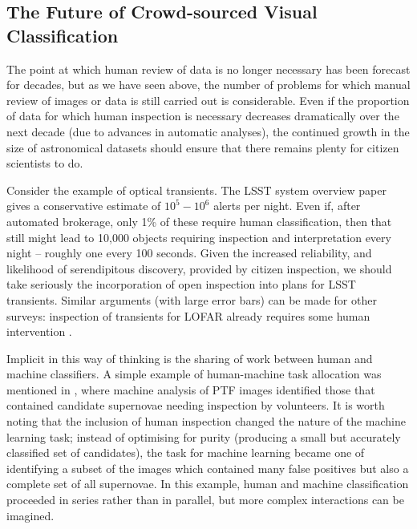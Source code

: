 \documentclass{ar2e}
\begin{document}

% 

\subsection{The Future of Crowd-sourced Visual Classification}

The point at which human review of data is no longer necessary has been forecast
for decades, but as we have seen above, the number of problems for which manual
review of images or data is still carried out is considerable. Even if the
proportion of data for which human inspection is necessary decreases
dramatically over the next decade (due to advances in automatic analyses), the
continued growth in the size of astronomical datasets should ensure that there
remains plenty for citizen scientists to do. 

Consider the example of optical transients. The LSST system overview paper
\citep{LSSTsystem} gives a conservative estimate of $10^5-10^6$ alerts per
night. Even if, after automated brokerage, only 1\% of these require human
classification, then that still might lead to 10,000 objects requiring
inspection and interpretation every night -- roughly one every 100 seconds.
Given the increased reliability, and likelihood of serendipitous discovery,
provided by citizen inspection, we should take seriously the incorporation of
open inspection into plans for LSST transients. Similar arguments (with large
error bars) can be made for other surveys: inspection of transients for LOFAR
already requires some human intervention \citep{LOFAR}. 


Implicit in this way of thinking is the sharing of work between human and
machine classifiers.  A simple example of human-machine task allocation was
mentioned in , where machine analysis of PTF images
identified those that contained candidate supernovae needing inspection by
volunteers. It is worth noting that the inclusion of human inspection changed
the nature of the machine learning task; instead of optimising for purity
(producing a small but accurately classified set of candidates), the task for
machine learning became one of identifying a subset of the images which
contained many false positives but also a complete set of all supernovae. 
In this example, human and machine classification proceeded in series rather
than in parallel, but more complex interactions can be imagined. 
\end{document}
